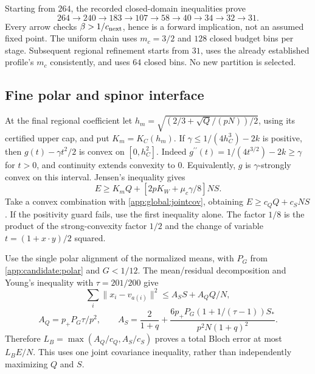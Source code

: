 Starting from $264$, the recorded closed-domain inequalities prove
\begin{equation}\label{app:global:chain}
 264\longrightarrow240\longrightarrow183\longrightarrow107
 \longrightarrow58\longrightarrow40\longrightarrow34
 \longrightarrow32\longrightarrow31.
\end{equation}
Every arrow checks $\beta>1/c_{\rm next}$, hence is a forward implication,
not an assumed fixed point. The uniform chain uses $m_c=3/2$ and $128$
closed budget bins per stage. Subsequent regional refinement starts
from $31$, uses the already established profile's $m_c$ consistently,
and uses $64$ closed bins. No new partition is selected.

\subsection{Fine polar and spinor interface}
At the final regional coefficient let
$h_m=\sqrt{(2/3+\sqrt Q/(pN))/2}$, using its certified upper cap,
and put $K_m=K_C(h_m)$. If
$\gamma\le1/(4h_C^3)-2k$ is positive, then
$g(t)-\gamma t^2/2$ is convex on $[0,h_C^2]$. Indeed
$g^{\prime\prime}(t)=1/(4t^{3/2})-2k\ge\gamma$ for $t>0$,
and continuity extends convexity to $0$. Equivalently, $g$ is
$\gamma$-strongly convex on this interval. Jensen's inequality gives
\[
 E\ge K_mQ+[2pK_W+\mu_c\gamma/8]NS.
\]
Take a convex combination with \eqref{app:global:jointcov}, obtaining
$E\ge c_QQ+c_SNS$. If the positivity guard fails, use the first
inequality alone. The factor $1/8$ is the product of the strong-convexity
factor $1/2$ and the change of variable $t=(1+x\cdot y)/2$ squared.

Use the single polar alignment of the normalized means, with $P_G$ from
\eqref{app:candidate:polar} and $G<1/12$. The mean/residual decomposition
and Young's inequality with $\tau=201/200$ give
\[
 \sum_i\|x_i-v_{a(i)}\|^2\le A_SS+A_QQ/N,
\]
\[
 A_Q=p_+P_G\tau/p^2,\qquad
 A_S=\frac2{1+q}+
 \frac{6p_+P_G(1+1/(\tau-1))S_*}{p^2N(1+q)^2}.
\]
Therefore $L_B=\max(A_Q/c_Q,A_S/c_S)$ proves a total Bloch error
at most $L_BE/N$. This uses one joint covariance inequality, rather
than independently maximizing $Q$ and $S$.

